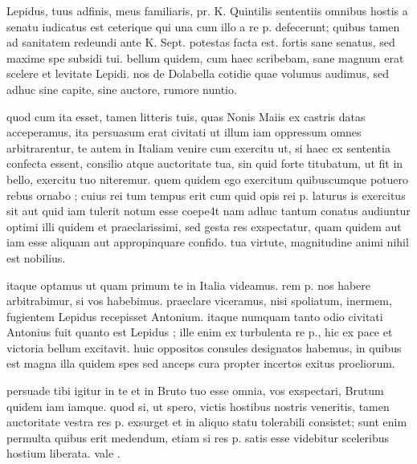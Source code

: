 


 Lepidus, tuus adfinis, meus familiaris, pr. K. Quintilis sententiis omnibus hostis a senatu iudicatus est ceterique qui una cum illo a re p. defecerunt; quibus tamen ad sanitatem redeundi ante K. Sept. potestas facta est. fortis sane senatus, sed maxime spe subsidi tui. bellum quidem, cum haec scribebam, sane magnum erat scelere et levitate Lepidi. nos de Dolabella cotidie quae volumus audimus, sed adhuc sine capite, sine auctore, rumore nuntio.

 quod cum ita esset, tamen litteris tuis, quas Nonis Maiis ex castris datas acceperamus, ita persuasum erat civitati ut illum iam oppressum omnes arbitrarentur, te autem in Italiam venire cum exercitu ut, si haec ex sententia confecta essent, consilio atque auctoritate tua, sin quid forte titubatum, ut fit in bello, exercitu tuo niteremur. quem quidem ego exercitum quibuscumque potuero rebus ornabo ; cuius rei tum tempus erit cum quid opis rei p. laturus is exercitus sit aut quid iam tulerit notum esse coepe4t nam adhuc tantum conatus audiuntur optimi illi quidem et praeclarissimi, sed gesta res exspectatur, quam quidem aut iam esse aliquam aut appropinquare confido. tua virtute, magnitudine animi nihil est nobilius.

 itaque optamus ut quam primum te in Italia videamus. rem p. nos habere arbitrabimur, si vos habebimus. praeclare viceramus, nisi spoliatum, inermem, fugientem Lepidus recepisset Antonium. itaque numquam tanto odio civitati Antonius fuit quanto est Lepidus ; ille enim ex turbulenta re p., hic ex pace et victoria bellum excitavit. huic oppositos consules designatos habemus, in quibus est magna illa quidem spes sed anceps cura propter incertos exitus proeliorum.

 persuade tibi igitur in te et in Bruto tuo esse omnia, vos exspectari, Brutum quidem iam iamque. quod si, ut spero, victis hostibus nostris veneritis, tamen auctoritate vestra res p. exsurget et in aliquo statu tolerabili consistet; sunt enim permulta quibus erit medendum, etiam si res p. satis esse videbitur sceleribus hostium liberata. vale .

